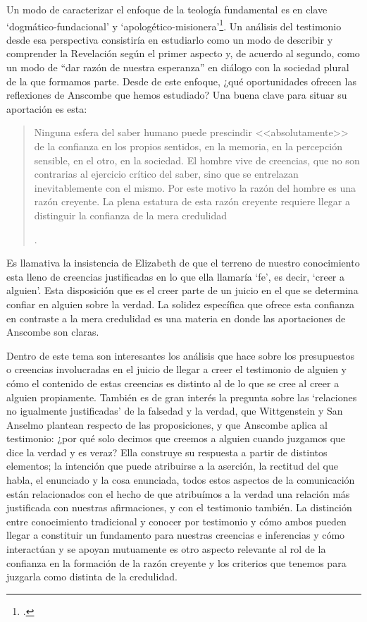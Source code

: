Un modo de caracterizar el enfoque de la teología fundamental es en clave `dogmático-fundacional' y `apologético-misionera'\footnote{\Cite[Cf.][80-85]{ninot2009tf}.}. Un análisis del testimonio desde esa perspectiva consistiría en estudiarlo como un modo de describir y comprender la Revelación según el primer aspecto y, de acuerdo al segundo, como un modo de ``dar razón de nuestra esperanza'' en diálogo con la sociedad plural de la que formamos parte. Desde de este enfoque, ¿qué oportunidades ofrecen las reflexiones de Anscombe que hemos estudiado? Una buena clave para situar su aportación es esta: \blockquote[{\Cite[451]{prades2015testimonio}}.]{Ninguna esfera del saber humano puede prescindir <<absolutamente>> de la confianza en los propios sentidos, en la memoria, en la percepción sensible, en el otro, en la sociedad. El hombre vive de creencias, que no son contrarias al ejercicio crítico del saber, sino que se entrelazan inevitablemente con el mismo. Por este motivo la razón del hombre es una razón creyente. La plena estatura de esta razón creyente requiere llegar a distinguir la confianza de la mera credulidad}. Es llamativa la insistencia de Elizabeth de que el terreno de nuestro conocimiento esta lleno de creencias justificadas en lo que ella llamaría `fe', es decir, `creer a alguien'. Esta disposición que es el creer parte de un juicio en el que se determina confiar en alguien sobre la verdad. La solidez específica que ofrece esta confianza en contraste a la mera credulidad es una materia en donde las aportaciones de Anscombe son claras.
\label{subsec:confianza}

Dentro de este tema son interesantes los análisis que hace sobre los presupuestos o creencias involucradas en el juicio de llegar a creer el testimonio de alguien y cómo el contenido de estas creencias es distinto al de lo que se cree al creer a alguien propiamente. También es de gran interés la pregunta sobre las `relaciones no igualmente justificadas' de la falsedad y la verdad, que Wittgenstein y San Anselmo plantean respecto de las proposiciones, y que Anscombe aplica al testimonio: ¿por qué solo decimos que creemos a alguien cuando juzgamos que dice la verdad y es veraz? Ella construye su respuesta a partir de distintos elementos; la intención que puede atribuirse a la aserción, la rectitud del que habla, el enunciado y la cosa enunciada, todos estos aspectos de la comunicación están relacionados con el hecho de que atribuímos a la verdad una relación más justificada con nuestras afirmaciones, y con el testimonio también. La distinción entre conocimiento tradicional y conocer por testimonio y cómo ambos pueden llegar a constituir un fundamento para nuestras creencias e inferencias y cómo interactúan y se apoyan mutuamente es otro aspecto relevante al rol de la confianza en la formación de la razón creyente y los criterios que tenemos para juzgarla como distinta de la credulidad.


